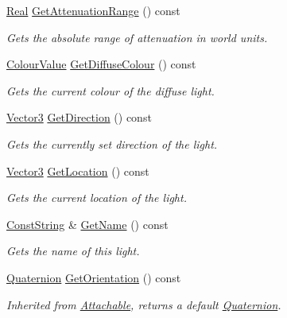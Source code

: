 \begin{DoxyCompactItemize}
\hyperlink{namespaceMezzanine_a726731b1a7df72bf3583e4a97282c6f6}{Real} \hyperlink{classMezzanine_1_1Light_af94876bf25ec03b1cf34daeff1ffecd3}{GetAttenuationRange} () const 
\begin{DoxyCompactList}\small\item\em Gets the absolute range of attenuation in world units. \item\end{DoxyCompactList}\item 
\hyperlink{classMezzanine_1_1ColourValue}{ColourValue} \hyperlink{classMezzanine_1_1Light_af21912b8f7421f79bc8a24e7127b8d51}{GetDiffuseColour} () const 
\begin{DoxyCompactList}\small\item\em Gets the current colour of the diffuse light. \item\end{DoxyCompactList}\item 
\hyperlink{classMezzanine_1_1Vector3}{Vector3} \hyperlink{classMezzanine_1_1Light_a86b7fec45b3b9476a5f02cee0386c29c}{GetDirection} () const 
\begin{DoxyCompactList}\small\item\em Gets the currently set direction of the light. \item\end{DoxyCompactList}\item 
\hyperlink{classMezzanine_1_1Vector3}{Vector3} \hyperlink{classMezzanine_1_1Light_a997d299abec130a6a9111b5659a6b0d2}{GetLocation} () const 
\begin{DoxyCompactList}\small\item\em Gets the current location of the light. \item\end{DoxyCompactList}\item 
\hyperlink{namespaceMezzanine_a63cd699ac54b73953f35ec9cfc05e506}{ConstString} \& \hyperlink{classMezzanine_1_1Light_a1488e39ce34aab274ee5618aeb1f810d}{GetName} () const 
\begin{DoxyCompactList}\small\item\em Gets the name of this light. \item\end{DoxyCompactList}\item 
\hyperlink{classMezzanine_1_1Quaternion}{Quaternion} \hyperlink{classMezzanine_1_1Light_a08a415b00c94345ebb5155fa15819296}{GetOrientation} () const 
\begin{DoxyCompactList}\small\item\em Inherited from \hyperlink{classMezzanine_1_1Attachable}{Attachable}, returns a default \hyperlink{classMezzanine_1_1Quaternion}{Quaternion}. \item\end{DoxyCompactList}\item 

\end{DoxyCompactItemize}
